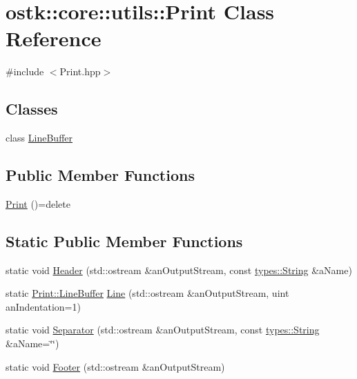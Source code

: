 \hypertarget{classostk_1_1core_1_1utils_1_1_print}{}\section{ostk\+:\+:core\+:\+:utils\+:\+:Print Class Reference}
\label{classostk_1_1core_1_1utils_1_1_print}


{\ttfamily \#include $<$Print.\+hpp$>$}

\subsection*{Classes}
\begin{DoxyCompactItemize}
\item 
class \hyperlink{classostk_1_1core_1_1utils_1_1_print_1_1_line_buffer}{Line\+Buffer}
\end{DoxyCompactItemize}
\subsection*{Public Member Functions}
\begin{DoxyCompactItemize}
\item 
\hyperlink{classostk_1_1core_1_1utils_1_1_print_add7ff48ddf9697f051509f88428ac207}{Print} ()=delete
\end{DoxyCompactItemize}
\subsection*{Static Public Member Functions}
\begin{DoxyCompactItemize}
\item 
static void \hyperlink{classostk_1_1core_1_1utils_1_1_print_ad5920ac45d26f9bc6e07160ea3af4cc5}{Header} (std\+::ostream \&an\+Output\+Stream, const \hyperlink{classostk_1_1core_1_1types_1_1_string}{types\+::\+String} \&a\+Name)
\item 
static \hyperlink{classostk_1_1core_1_1utils_1_1_print_1_1_line_buffer}{Print\+::\+Line\+Buffer} \hyperlink{classostk_1_1core_1_1utils_1_1_print_a1aeb071e217dabc5df02b5692d3d3e10}{Line} (std\+::ostream \&an\+Output\+Stream, uint an\+Indentation=1)
\item 
static void \hyperlink{classostk_1_1core_1_1utils_1_1_print_a4269f70cba2a05eb79a21756a38bb68b}{Separator} (std\+::ostream \&an\+Output\+Stream, const \hyperlink{classostk_1_1core_1_1types_1_1_string}{types\+::\+String} \&a\+Name=\char`\"{}\char`\"{})
\item 
static void \hyperlink{classostk_1_1core_1_1utils_1_1_print_af2493f2770f18699410630710a8105a4}{Footer} (std\+::ostream \&an\+Output\+Stream)
\end{DoxyCompactItemize}


